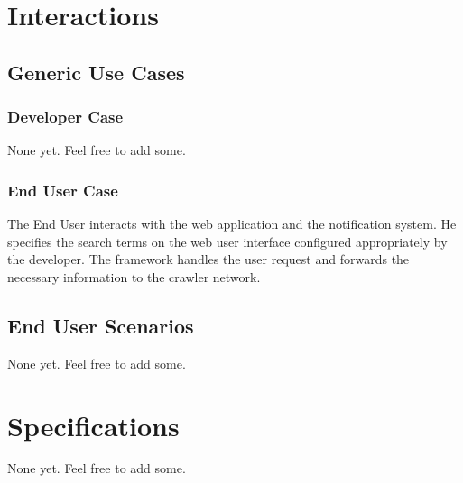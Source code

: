 \documentclass[a4paper,10pt]{article} \usepackage{anysize}
\begin{document}
\section{Interactions}
    \subsection{Generic Use Cases}
        \subsubsection{Developer Case}
            None yet. Feel free to add some.
        \subsubsection{End User Case}
            The End User interacts with the web application and the notification
            system. He specifies the search terms on the web user interface configured
            appropriately by the developer. The framework handles the user request and
            forwards the necessary information to the crawler network.

    \subsection{End User Scenarios}
        None yet. Feel free to add some.

\section{Specifications}
    None yet. Feel free to add some.
\end{document}
